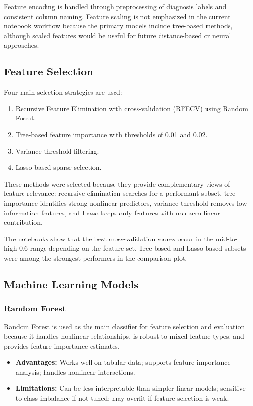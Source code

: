 \documentclass[11pt,a4paper]{article}
\begin{document}
Feature encoding is handled through preprocessing of diagnosis labels and consistent column naming. Feature scaling is not emphasized in the current notebook workflow because the primary models include tree-based methods, although scaled features would be useful for future distance-based or neural approaches.

\subsection{Feature Selection}
Four main selection strategies are used:
\begin{enumerate}[leftmargin=*]
    \item Recursive Feature Elimination with cross-validation (RFECV) using Random Forest.
    \item Tree-based feature importance with thresholds of 0.01 and 0.02.
    \item Variance threshold filtering.
    \item Lasso-based sparse selection.
\end{enumerate}

These methods were selected because they provide complementary views of feature relevance: recursive elimination searches for a performant subset, tree importance identifies strong nonlinear predictors, variance threshold removes low-information features, and Lasso keeps only features with non-zero linear contribution.

The notebooks show that the best cross-validation scores occur in the mid-to-high 0.6 range depending on the feature set. Tree-based and Lasso-based subsets were among the strongest performers in the comparison plot.

\subsection{Machine Learning Models}
\subsubsection{Random Forest}


Random Forest is used as the main classifier for feature selection and evaluation because it handles nonlinear relationships, is robust to mixed feature types, and provides feature importance estimates.

\begin{itemize}[leftmargin=*]
    \item \textbf{Advantages:} Works well on tabular data; supports feature importance analysis; handles nonlinear interactions.
    \item \textbf{Limitations:} Can be less interpretable than simpler linear models; sensitive to class imbalance if not tuned; may overfit if feature selection is weak.
\end{itemize}
\end{document}
